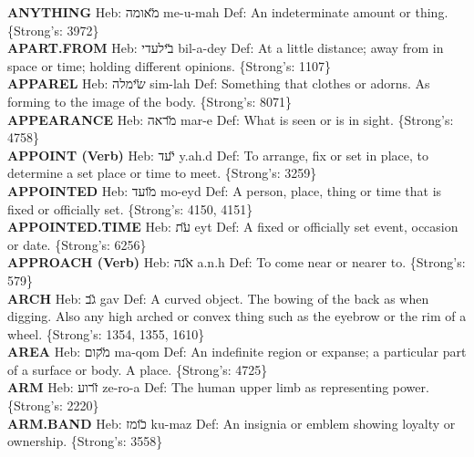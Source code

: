 {\textbf{ANYTHING} Heb: {\large\H מאומה} me-u-mah Def: An indeterminate amount or thing. \{Strong's: 3972\}\hfill{}\\

\textbf{APART.FROM} Heb: {\large\H בילעדי} bil-a-dey Def: At a little distance; away from in space or time; holding different opinions. \{Strong's: 1107\}\hfill{}\\

\textbf{APPAREL} Heb: {\large\H שימלה} sim-lah Def: Something that clothes or adorns. As forming to the image of the body. \{Strong's: 8071\}\hfill{}\\

\textbf{APPEARANCE} Heb: {\large\H מראה} mar-e Def: What is seen or is in sight. \{Strong's: 4758\}\hfill{}\\

\textbf{APPOINT (Verb)} Heb: {\large\H יעד} y.ah.d Def: To arrange, fix or set in place, to determine a set place or time to meet. \{Strong's: 3259\}\hfill{}\\

\textbf{APPOINTED} Heb: {\large\H מועד} mo-eyd Def: A person, place, thing or time that is fixed or officially set. \{Strong's: 4150, 4151\}\hfill{}\\

\textbf{APPOINTED.TIME} Heb: {\large\H עת} eyt Def: A fixed or officially set event, occasion or date. \{Strong's: 6256\}\hfill{}\\

\textbf{APPROACH (Verb)} Heb: {\large\H אנה} a.n.h Def: To come near or nearer to. \{Strong's: 579\}\hfill{}\\

\textbf{ARCH} Heb: {\large\H גב} gav Def: A curved object. The bowing of the back as when digging. Also any high arched or convex thing such as the eyebrow or the rim of a wheel. \{Strong's: 1354, 1355, 1610\}\hfill{}\\

\textbf{AREA} Heb: {\large\H מקום} ma-qom Def: An indefinite region or expanse; a particular part of a surface or body. A place. \{Strong's: 4725\}\hfill{}\\

\textbf{ARM} Heb: {\large\H זרוע} ze-ro-a Def: The human upper limb as representing power. \{Strong's: 2220\}\hfill{}\\

\textbf{ARM.BAND} Heb: {\large\H כומז} ku-maz Def: An insignia or emblem showing loyalty or ownership. \{Strong's: 3558\}\hfill{}\\

}
